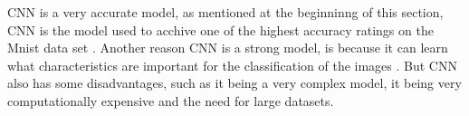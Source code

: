 CNN is a very accurate model, as mentioned at the beginninng of this section, CNN is the model used to acchive one of the highest accuracy ratings on the Mnist data set \cite{MnistStatictics}. Another reason CNN is a strong model, is because it can learn what characteristics are important for the classification of the images \cite{CNNProsAndCons}. But CNN also has some disadvantages, such as it being a very complex model, it being very computationally expensive and the need for large datasets.





